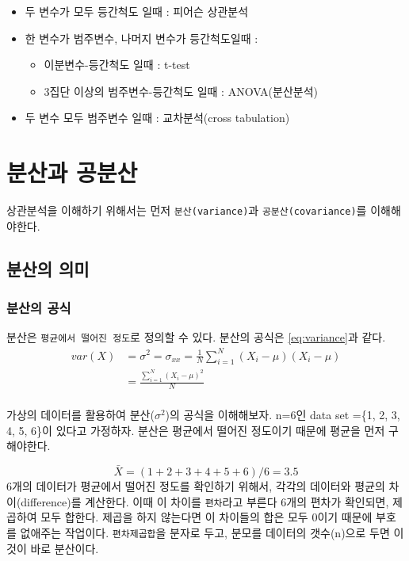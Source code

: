 \documentclass[
]{book}
\providecommand{\tightlist}{%
  \setlength{\itemsep}{0pt}\setlength{\parskip}{0pt}}
\begin{document}
\begin{itemize}
\tightlist
\item
  두 변수가 모두 등간척도 일때 : 피어슨 상관분석
\item
  한 변수가 범주변수, 나머지 변수가 등간척도일때 :

  \begin{itemize}
  \tightlist
  \item
    이분변수-등간척도 일때 : t-test
  \item
    3집단 이상의 범주변수-등간척도 일때 : ANOVA(분산분석)
  \end{itemize}
\item
  두 변수 모두 범주변수 일때 : 교차분석(cross tabulation)
\end{itemize}

\section{분산과 공분산}\label{uxbd84uxc0b0uxacfc-uxacf5uxbd84uxc0b0}

상관분석을 이해하기 위해서는 먼저 \texttt{분산(variance)}과 \texttt{공분산(covariance)}를 이해해야한다.

\subsection{분산의 의미}\label{uxbd84uxc0b0uxc758-uxc758uxbbf8}

\subsubsection{분산의 공식}\label{uxbd84uxc0b0uxc758-uxacf5uxc2dd}

분산은 \texttt{평균에서\ 떨어진\ 정도}로 정의할 수 있다. 분산의 공식은 \eqref{eq:variance}과 같다.
\begin{equation}
\begin{split}
var(X) & =\sigma^2=\sigma_{xx}=\frac{1}{N}\sum_{i=1}^{N}(X_{i}-\mu)(X_{i}-\mu)\\
& =\frac{\sum_{i=1}^{N}(X_{i}-\mu)^2}{N}\\
\end{split}
\label{eq:variance}
\end{equation}

가상의 데이터를 활용하여 분산(\(\sigma^2\))의 공식을 이해해보자. n=6인 data set =\{1, 2, 3, 4, 5, 6\}이 있다고 가정하자. 분산은 평균에서 떨어진 정도이기 때문에 평균을 먼저 구해야한다.

\[\bar{X}=(1+2+3+4+5+6)/6=3.5\]
6개의 데이터가 평균에서 떨어진 정도를 확인하기 위해서, 각각의 데이터와 평균의 차이(difference)를 계산한다. 이때 이 차이를 \texttt{편차}라고 부른다 6개의 편차가 확인되면, 제곱하여 모두 합한다. 제곱을 하지 않는다면 이 차이들의 합은 모두 0이기 때문에 부호를 없애주는 작업이다. \texttt{편차제곱합}을 분자로 두고, 분모를 데이터의 갯수(n)으로 두면 이것이 바로 분산이다.
\end{document}
